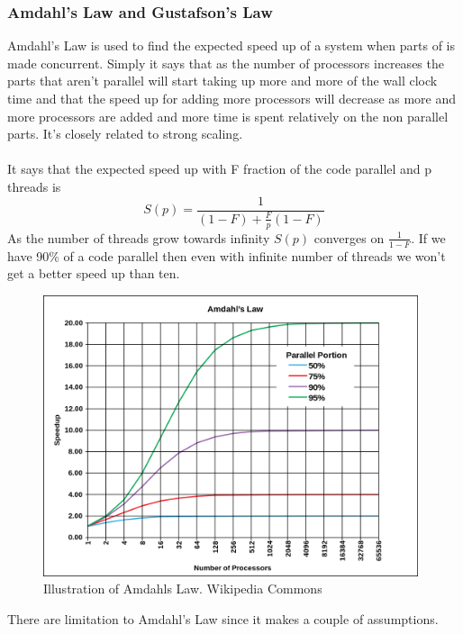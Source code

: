 \documentclass[10pt,a4paper]{report}
\begin{document}
\subsubsection{Amdahl's Law and Gustafson's Law}
Amdahl's Law is used to find the expected speed up of a system when parts of is made concurrent. Simply it says that as the number of processors increases the parts that aren't parallel will start taking up more and more of the wall clock time and that the speed up for adding more processors will decrease as more and more processors are added and more time is spent relatively on the non parallel parts. It's closely related to strong scaling.\cite{cuda_best_practice,2010_reevaluating_amdahl}\\
\\
It says that the expected speed up with F fraction of the code parallel and p threads is 
$$S(p)=\frac{1}{(1-F)+\frac{F}{p}(1-F)}$$
As the number of threads grow towards infinity $S(p)$ converges on $\frac{1}{1-F}$. If we have 90\% of a code parallel then even with infinite number of threads we won't get a better speed up than ten.\cite{2010_reevaluating_amdahl}

\begin{figure}[h]
    \centering
    \includegraphics[width=11cm]{AmdahlsLaw.png}
    \caption{Illustration of Amdahls Law. Wikipedia Commons}
    \label{fig:AmdahlsLaw}
\end{figure}

There are limitation to Amdahl's Law since it makes a couple of assumptions.
\end{document}

